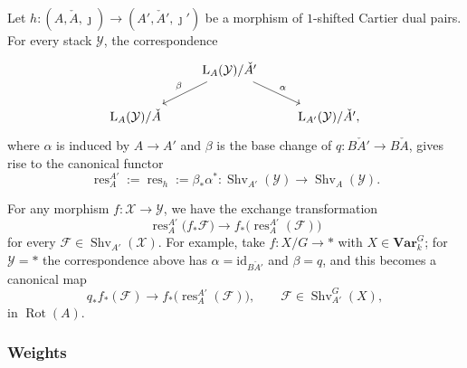 \documentclass[12pt, oneside]{amsart}
\numberwithin{equation}{section}
\theoremstyle{remark}
\theoremstyle{plain}
\newcommand{\Loop}{\operatorname{L}}
\newcommand{\YY}{\mathcal{Y}}
\newcommand{\XX}{\mathcal{X}}
\newcommand{\Var}{\mathbf{Var}_{k}}
\newcommand{\id}{\mathrm{id}}
\newcommand{\Shv}{\operatorname{Shv}}
\newcommand{\Rot}{\operatorname{Rot}}
\newcommand{\cF}{\mathcal{F}}
\begin{document}
Let $h : (A,\check{A},\jmath) \to (A',\check{A}',\jmath')$ be a morphism of $1$-shifted Cartier dual pairs.
For every stack $\YY$, the correspondence
\[\begin{tikzcd}
  & \Loop_A(\YY)/\check{A}' \ar[swap]{ld}{\beta}\ar{rd}{\alpha} &
  \\
  \Loop_A(\YY)/\check{A} & & \Loop_{A'}(\YY)/\check{A}',
\end{tikzcd}\]
where $\alpha$ is induced by $A \to A'$ and $\beta$ is the base change of $q : B\check{A}' \to B\check{A}$, gives rise to the canonical functor
\[
  \operatorname{res}^{A'}_A := \operatorname{res}_h := \beta_* \alpha^* : \Shv_{A'}(\YY) \to \Shv_A(\YY).
\]

For any morphism $f : \XX \to \YY$, we have the exchange transformation
\begin{equation}
  \operatorname{res}_A^{A'} \bigl(f_*\cF\bigr) \to f_* \bigl( \operatorname{res}_A^{A'} (\cF) \bigr)
\end{equation}
for every $\cF \in \Shv_{A'}(\XX)$.
For example, take $f : X/G \to *$ with $X \in \Var^G$; for $\YY=*$ the correspondence above has $\alpha = \id_{B\check{A}'}$ and $\beta=q$, and this becomes a canonical map
\begin{equation}\label{eq:push to res A A'}
	q_* f_*(\cF) \to f_* \bigl( \operatorname{res}_A^{A'} (\cF) \bigr),
	\qquad \cF \in \Shv_{A'}^G(X),
\end{equation}
in $\Rot(A)$.

\subsubsection{Weights}\label{sssec:Shv wt=chi}
\end{document}
